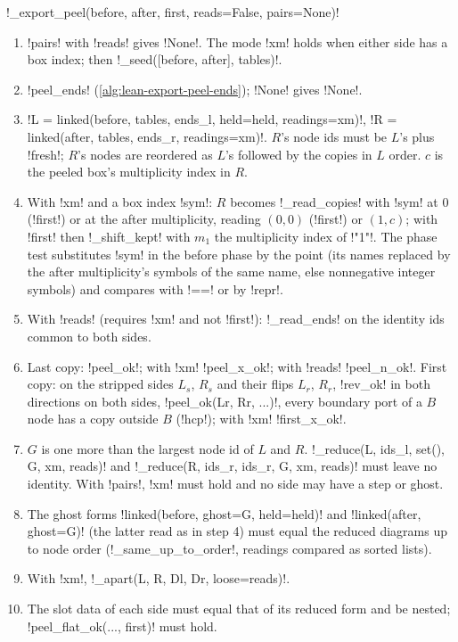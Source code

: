{{{\begin{signature}
\lexpy!_export_peel(before, after, first, reads=False, pairs=None)!
\end{signature}
\begin{algorithm}\label{alg:lean-export-peel}\sloppy
\begin{enumerate}
\item \lexcode!pairs! with \lexcode!reads! gives \lexpy!None!. The mode \lexcode!xm! holds when either side has
a box index; then \lexpy!_seed([before, after], tables)!.
\item \lexpy!peel_ends! (\cref{alg:lean-export-peel-ends}); \lexpy!None! gives \lexpy!None!.
\item \lexpy!L = linked(before, tables, ends_l, held=held, readings=xm)!,
\lexpy!R = linked(after, tables, ends_r, readings=xm)!. $R$'s node ids must be $L$'s plus
\lexcode!fresh!; $R$'s nodes are reordered as $L$'s followed by the copies in $L$ order. $c$ is the
peeled box's multiplicity index in $R$.
\item With \lexcode!xm! and a box index \lexcode!sym!: $R$ becomes \lexpy!_read_copies! with \lexcode!sym! at
$0$ (\lexcode!first!) or at the after multiplicity, reading $(0,0)$ (\lexcode!first!) or $(1, c)$; with
\lexcode!first! then \lexpy!_shift_kept! with $m_1$ the multiplicity index of \lexcode!"1"!. The phase test
substitutes \lexcode!sym! in the before phase by the point (its names replaced by the after
multiplicity's symbols of the same name, else nonnegative integer symbols) and compares with
\lexpy!==! or by \lexpy!repr!.
\item With \lexcode!reads! (requires \lexcode!xm! and not \lexcode!first!): \lexpy!_read_ends! on the identity
ids common to both sides.
\item Last copy: \lexpy!peel_ok!; with \lexcode!xm! \lexpy!peel_x_ok!; with \lexcode!reads!
\lexpy!peel_n_ok!. First copy: on the stripped sides $L_s$, $R_s$ and their flips $L_r$, $R_r$,
\lexpy!rev_ok! in both directions on both sides, \lexpy!peel_ok(Lr, Rr, ...)!, every boundary port of a
$B$ node has a copy outside $B$ (\lexlean!hcp!); with \lexcode!xm! \lexpy!first_x_ok!.
\item $G$ is one more than the largest node id of $L$ and $R$.
\lexpy!_reduce(L, ids_l, set(), G, xm, reads)! and \lexpy!_reduce(R, ids_r, ids_r, G, xm, reads)!
must leave no identity. With \lexcode!pairs!, \lexcode!xm! must hold and no side may have a step or
ghost.
\item The ghost forms \lexpy!linked(before, ghost=G, held=held)! and
\lexpy!linked(after, ghost=G)! (the latter read as in step 4) must equal the reduced diagrams up to
node order (\lexpy!_same_up_to_order!, readings compared as sorted lists).
\item With \lexcode!xm!, \lexpy!_apart(L, R, Dl, Dr, loose=reads)!.
\item The slot data of each side must equal that of its reduced form and be nested;
\lexpy!peel_flat_ok(..., first)! must hold.
\end{enumerate}
\end{algorithm}

}}}
